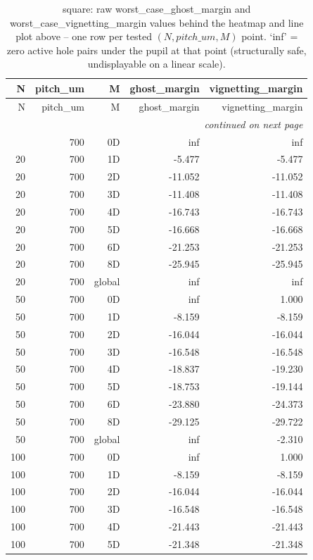 \begin{longtable}{rrrrr}
\caption{square: raw worst\_case\_ghost\_margin and worst\_case\_vignetting\_margin values behind the heatmap and line plot above -- one row per tested $(N, pitch\_um, M)$ point. `inf' = zero active hole pairs under the pupil at that point (structurally safe, undisplayable on a linear scale).} \\
\toprule
N & pitch\_um & M & ghost\_margin & vignetting\_margin \\
\midrule
\endfirsthead
\toprule
N & pitch\_um & M & ghost\_margin & vignetting\_margin \\
\midrule
\endhead
\midrule
\multicolumn{5}{r}{\itshape continued on next page} \\
\endfoot
\bottomrule
\endlastfoot
20 & 700 & 0D & inf & inf \\
20 & 700 & 1D & -5.477 & -5.477 \\
20 & 700 & 2D & -11.052 & -11.052 \\
20 & 700 & 3D & -11.408 & -11.408 \\
20 & 700 & 4D & -16.743 & -16.743 \\
20 & 700 & 5D & -16.668 & -16.668 \\
20 & 700 & 6D & -21.253 & -21.253 \\
20 & 700 & 8D & -25.945 & -25.945 \\
20 & 700 & global & inf & inf \\
50 & 700 & 0D & inf & 1.000 \\
50 & 700 & 1D & -8.159 & -8.159 \\
50 & 700 & 2D & -16.044 & -16.044 \\
50 & 700 & 3D & -16.548 & -16.548 \\
50 & 700 & 4D & -18.837 & -19.230 \\
50 & 700 & 5D & -18.753 & -19.144 \\
50 & 700 & 6D & -23.880 & -24.373 \\
50 & 700 & 8D & -29.125 & -29.722 \\
50 & 700 & global & inf & -2.310 \\
100 & 700 & 0D & inf & 1.000 \\
100 & 700 & 1D & -8.159 & -8.159 \\
100 & 700 & 2D & -16.044 & -16.044 \\
100 & 700 & 3D & -16.548 & -16.548 \\
100 & 700 & 4D & -21.443 & -21.443 \\
100 & 700 & 5D & -21.348 & -21.348 \\

\end{longtable}
